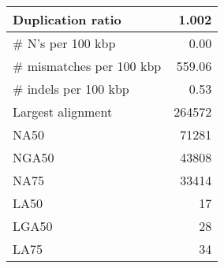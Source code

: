 \documentclass[12pt,a4paper]{article}
\begin{document}
\begin{table}[ht]
\begin{center}
\begin{tabular}{|l*{1}{|r}|}
Duplication ratio & 1.002 \\ \hline
\# N's per 100 kbp & 0.00 \\ \hline
\# mismatches per 100 kbp & 559.06 \\ \hline
\# indels per 100 kbp & 0.53 \\ \hline
Largest alignment & 264572 \\ \hline
NA50 & 71281 \\ \hline
NGA50 & 43808 \\ \hline
NA75 & 33414 \\ \hline
LA50 & 17 \\ \hline
LGA50 & 28 \\ \hline
LA75 & 34 \\ \hline
\end{tabular}
\end{center}
\end{table}
\end{document}
